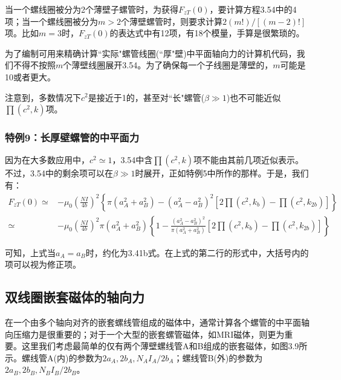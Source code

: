 当一个螺线圈被分为2个薄壁子螺管时，为获得$F_{zT}(0)$，要计算方程3.54中的4项；当一个螺线圈被分为$m>2$个薄壁螺管时，则要求计算$2(m!)/[(m−2)!]$项。比如$m=3$时，$F_{zT}(0)$的表达式中有12项，有18个模量，手算是很繁琐的。

为了编制可用来精确计算``实际"螺管线圈(``厚"壁)中平面轴向力的计算机代码，我们不得不按照$m$个薄壁线圈展开3.54。为了确保每一个子线圈是薄壁的，$m$可能是10或者更大。

注意到，多数情况下$c^2$是接近于1的，甚至对``长"螺管($\beta\gg 1$)也不可能近似$\prod(c^2,k)$项。

\subsubsection{特例9：长厚壁螺管的中平面力}
因为在大多数应用中，$c^2\simeq 1$，3.54中含$\prod{(c^2,k)}$项不能由其前几项近似表示。不过，3.54中的剩余项可以在$\beta \gg 1$时展开，正如特例5中所作的那样。于是，我们有：
\begin{equation}
\begin{split}
F_{zT}(0)\simeq& -\mu_0 (\frac{N I}{4b})^2\left\{ \pi(a_A^2+a_B^2)-(a_A^2-a_B^2)^2[2\prod(c^2,k_b)-\prod(c^2,k_{2b})]\right\}  \\
\simeq& -\mu_0 (\frac{N I}{4b})^2 \pi(a_A^2+a_B^2) \left\{1-\frac{(a_A^2-a_B^2)^2}{\pi(a_A^2+a_B^2)}[2\prod(c^2,k_b)-\prod(c^2,k_{2b})]\right\}
\end{split}
\end{equation}

可知，上式当$a_A=a_B$时，约化为3.41b式。在上式的第二行的形式中，大括号内的项可以视为修正项。

\subsection{双线圈嵌套磁体的轴向力}
在一个由多个轴向对齐的嵌套螺线管组成的磁体中，通常计算各个螺管的中平面轴向压缩力是很重要的；对于一个大型的嵌套螺管磁体，如MRI磁体，则更为重要。这里我们考虑最简单的仅有两个薄壁螺线管A和B组成的嵌套磁体，如图3.9所示。螺线管A(内)的参数为$2a_A,2b_A,N_A I_A/2b_A$；螺线管B(外)的参数为$2a_B, 2b_B, N_B I_B/2b_B$。
